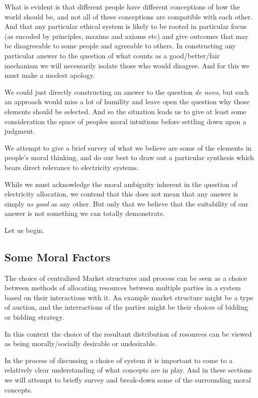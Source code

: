 What is evident is that different people have different conceptions of how the world should be, and not all of these conceptions are compatible with each other.
And that any particular ethical system is likely to be rooted in particular focus (as encoded by principles, maxims and axioms etc) and give outcomes that may be disagreeable to some people and agreeable to others.
In constructing any particular answer to the question of what counts as a good/better/fair mechanism we will necessarily isolate those who would disagree.
And for this we must make a modest apology.

We could just directly constructing an answer to the question \textit{de novo}, but such an approach would miss a lot of humility and leave open the question why those elements should be selected. And so the situation leads us to give at least some consideration the space of peoples moral intuitions before settling down upon a judgment.

We attempt to give a brief survey of what we believe are some of the elements in people's moral thinking, and do our best to draw out a particular synthesis which bears direct relevance to electricity systems.

While we must acknowledge the moral ambiguity inherent in the question of electricity allocation, we contend that this does not mean that any answer is simply \textit{as good} as any other. But only that we believe that the suitability of our answer is not something we can totally demonstrate.


Let us begin.

\subsection{Some Moral Factors}

The choice of centralized Market structures and process can be seen as a choice between methods of allocating resources between multiple parties in a system based on their interactions with it.
An example market structure might be a type of auction, and the interractions of the parties might be their choices of bidding or bidding strategy.

In this context the choice of the resultant distribution of resources can be viewed as being morally/socially desirable or undesirable.

In the process of discussing a choice of system it is important to come to a relatively clear understanding of what concepts are in play. And in these sections we will attempt to briefly survey and break-down some of the surrounding moral concepts.

